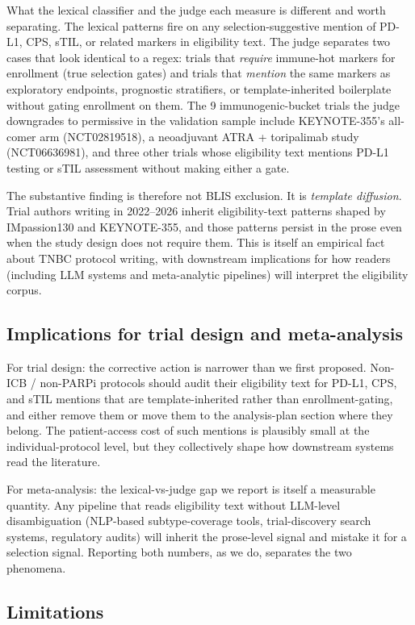 \documentclass{article}
\begin{document}
What the lexical classifier and the judge each measure is different
and worth separating.  The lexical patterns fire on any
selection-suggestive mention of PD-L1, CPS, sTIL, or related
markers in eligibility text.  The judge separates two cases that
look identical to a regex: trials that \emph{require} immune-hot
markers for enrollment (true selection gates) and trials that
\emph{mention} the same markers as exploratory endpoints,
prognostic stratifiers, or template-inherited boilerplate without
gating enrollment on them.  The 9 immunogenic-bucket trials the
judge downgrades to permissive in the validation sample include
KEYNOTE-355's all-comer arm (NCT02819518), a neoadjuvant
ATRA + toripalimab study (NCT06636981), and three other trials
whose eligibility text mentions PD-L1 testing or sTIL assessment
without making either a gate.

The substantive finding is therefore not BLIS exclusion.  It is
\emph{template diffusion}.  Trial authors writing in 2022--2026
inherit eligibility-text patterns shaped by IMpassion130 and
KEYNOTE-355, and those patterns persist in the prose even when the
study design does not require them.  This is itself an empirical
fact about TNBC protocol writing, with downstream implications for
how readers (including LLM systems and meta-analytic pipelines) will
interpret the eligibility corpus.

\subsection{Implications for trial design and meta-analysis}
For trial design: the corrective action is narrower than we first
proposed.  Non-ICB / non-PARPi protocols should audit their
eligibility text for PD-L1, CPS, and sTIL mentions that are
template-inherited rather than enrollment-gating, and either remove
them or move them to the analysis-plan section where they belong.
The patient-access cost of such mentions is plausibly small at the
individual-protocol level, but they collectively shape how
downstream systems read the literature.

For meta-analysis: the lexical-vs-judge gap we report is itself a
measurable quantity.  Any pipeline that reads eligibility text
without LLM-level disambiguation (NLP-based subtype-coverage tools,
trial-discovery search systems, regulatory audits) will inherit the
prose-level signal and mistake it for a selection signal.  Reporting
both numbers, as we do, separates the two phenomena.

\subsection{Limitations}
\label{sec:limits}
\end{document}
